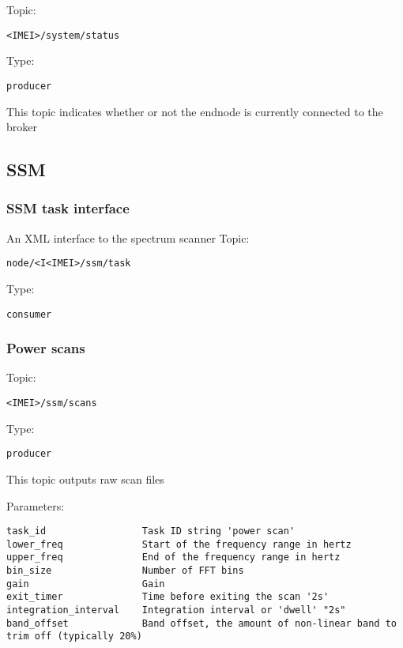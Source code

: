 Topic:
\begin{lstlisting}<IMEI>/system/status\end{lstlisting}
Type:
\begin{lstlisting}producer\end{lstlisting}
    
This topic indicates whether or not the endnode is currently connected to the broker

\subsection{SSM}

\subsubsection{SSM task interface}
An XML interface to the spectrum scanner
Topic:
\begin{lstlisting}node/<I<IMEI>/ssm/task\end{lstlisting}
Type:
\begin{lstlisting}consumer\end{lstlisting}

\subsubsection{Power scans}
Topic:
\begin{lstlisting}<IMEI>/ssm/scans\end{lstlisting}
Type:
\begin{lstlisting}producer\end{lstlisting}
    
This topic outputs raw scan files

Parameters:

\begin{lstlisting}
task_id                 Task ID string 'power scan'
lower_freq              Start of the frequency range in hertz
upper_freq              End of the frequency range in hertz
bin_size                Number of FFT bins
gain                    Gain
exit_timer              Time before exiting the scan '2s'
integration_interval    Integration interval or 'dwell' "2s"
band_offset             Band offset, the amount of non-linear band to trim off (typically 20%)
\end{lstlisting}

